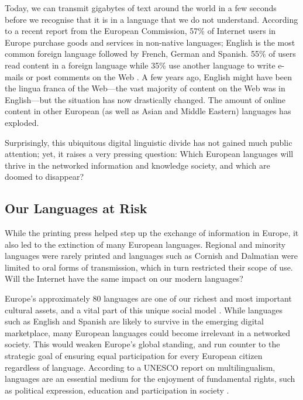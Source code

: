 \begin{multicols}{2}
Today, we can transmit gigabytes of text around the world in a few seconds before we recognise that it is in a language that we do not understand. According to a recent report from the European Commission, 57\% of Internet users in Europe purchase goods and services in non-native languages; English is the most common foreign language followed by French, German and Spanish. 55\% of users read content in a foreign language while 35\% use another language to write e-mails or post comments on the Web \cite{EC1}. A few years ago, English might have been the lingua franca of the Web—the vast majority of content on the Web was in English—but the situation has now drastically changed. The amount of online content in other European (as well as Asian and Middle Eastern) languages has exploded.

Surprisingly, this ubiquitous digital linguistic divide has not gained much public attention; yet, it raises a very pressing question: Which European languages will thrive in the networked information and knowledge society, and which are doomed to disappear?

\subsection{Our Languages at Risk}

While the printing press helped step up the exchange of information in Europe, it also led to the extinction of many European languages. Regional and minority languages were rarely printed and languages such as Cornish and Dalmatian were limited to oral forms of transmission, which in turn restricted their scope of use. Will the Internet have the same impact on our modern languages?


Europe’s approximately 80 languages are one of our richest and most important cultural assets, and a vital part of this unique social model \cite{EC2}. While languages such as English and Spanish are likely to survive in the emerging digital marketplace, many European languages could become irrelevant in a networked society. This would weaken Europe’s global standing, and run counter to the strategic goal of ensuring equal participation for every European citizen regardless of language. According to a UNESCO report on multilingualism, languages are an essential medium for the enjoyment of fundamental rights, such as political expression, education and participation in society \cite{Unesco1}.


\end{multicols}
